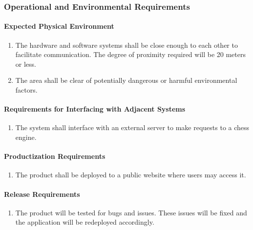 \documentclass[12pt]{article}
\begin{document}
{\subsubsection{Operational and Environmental Requirements}
\label{NFR_OE}
\paragraph{Expected Physical Environment}
\begin{enumerate}[{OE}1., leftmargin=2\parindent]
    \item The hardware and software systems shall be close enough to each other to facilitate communication. The degree of proximity required 
    will be 20 meters or less.
    \item The area shall be clear of potentially dangerous or harmful environmental factors.
\end{enumerate}

\paragraph{Requirements for Interfacing with Adjacent Systems}
\begin{enumerate}[{OE}1., leftmargin=2\parindent, resume]
    \item The system shall interface with an external server to make requests to a chess engine.
\end{enumerate}

\paragraph{Productization Requirements}
\begin{enumerate}[{OE}1., leftmargin=2\parindent, resume]
    \item The product shall be deployed to a public website where users may access it.
\end{enumerate}

\paragraph{Release Requirements}
\begin{enumerate}[{OE}1., leftmargin=2\parindent, resume]
    \item The product will be tested for bugs and issues. These issues will be fixed and the application will be redeployed accordingly.
\end{enumerate}



}
\end{document}
